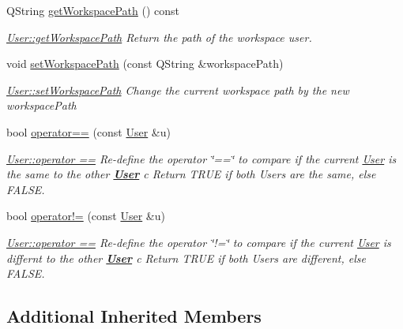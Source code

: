 \begin{DoxyCompactItemize}
Q\-String \hyperlink{classModels_1_1User_aa9421bda240316f9eebd0145f6dc3eda}{get\-Workspace\-Path} () const 
\begin{DoxyCompactList}\small\item\em \hyperlink{classModels_1_1User_aa9421bda240316f9eebd0145f6dc3eda}{User\-::get\-Workspace\-Path} Return the path of the workspace user. \end{DoxyCompactList}\item 
void \hyperlink{classModels_1_1User_ae62b6cc7c6c5f5ab80b9f066b67afc95}{set\-Workspace\-Path} (const Q\-String \&workspace\-Path)
\begin{DoxyCompactList}\small\item\em \hyperlink{classModels_1_1User_ae62b6cc7c6c5f5ab80b9f066b67afc95}{User\-::set\-Workspace\-Path} Change the current workspace path by the new {\itshape workspace\-Path} \end{DoxyCompactList}\item 
bool \hyperlink{classModels_1_1User_a60d18c2d1df053f1abf1215414f0b4b6}{operator==} (const \hyperlink{classModels_1_1User}{User} \&u)
\begin{DoxyCompactList}\small\item\em \hyperlink{classModels_1_1User_a60d18c2d1df053f1abf1215414f0b4b6}{User\-::operator ==} Re-\/define the operator \char`\"{}==\char`\"{} to compare if the current \hyperlink{classModels_1_1User}{User} is the same to the other {\bfseries \hyperlink{classModels_1_1User}{User}} {\itshape c} Return T\-R\-U\-E if both Users are the same, else F\-A\-L\-S\-E. \end{DoxyCompactList}\item 
bool \hyperlink{classModels_1_1User_aa1cdb1f752173aedd5f0c43edcb0b10b}{operator!=} (const \hyperlink{classModels_1_1User}{User} \&u)
\begin{DoxyCompactList}\small\item\em \hyperlink{classModels_1_1User_a60d18c2d1df053f1abf1215414f0b4b6}{User\-::operator ==} Re-\/define the operator \char`\"{}!=\char`\"{} to compare if the current \hyperlink{classModels_1_1User}{User} is differnt to the other {\bfseries \hyperlink{classModels_1_1User}{User}} {\itshape c} Return T\-R\-U\-E if both Users are different, else F\-A\-L\-S\-E. \end{DoxyCompactList}\end{DoxyCompactItemize}
\subsection*{Additional Inherited Members}


